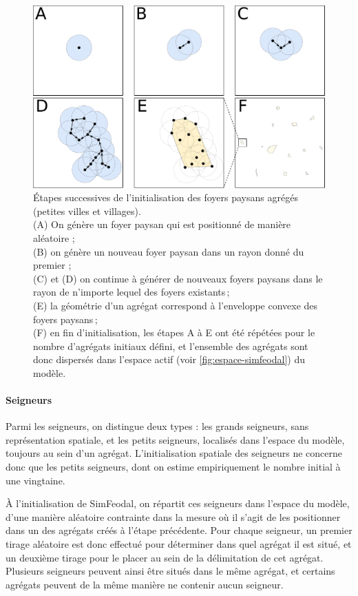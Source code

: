 \begin{figure}[H]
	\centering
	\includegraphics[width=.98\linewidth]{img/init_fp.pdf}
	\caption{Étapes successives de l'initialisation des foyers paysans agrégés (petites villes et villages).\\
	(A) On génère un foyer paysan qui est positionné de manière aléatoire ;\\
	(B) on génère un nouveau foyer paysan dans un rayon donné du premier ;\\
	(C) et (D) on continue à générer de nouveaux foyers paysans dans le rayon de n'importe lequel des foyers existants ;\\
	(E) la géométrie d'un agrégat correspond à l'enveloppe convexe des foyers paysans ;\\
	(F) en fin d'initialisation, les étapes A à E ont été répétées pour le nombre d'agrégats initiaux défini, et l'ensemble des agrégats sont donc dispersés dans l'espace actif (voir \cref{fig:espace-simfeodal}) du modèle.}
	\label{fig:init-fp}
\end{figure}


\paragraph{Seigneurs}
Parmi les seigneurs, on distingue deux types : les grands seigneurs, sans représentation spatiale, et les petits seigneurs, localisés dans l'espace du modèle, toujours au sein d'un agrégat.
L'initialisation spatiale des seigneurs ne concerne donc que les petits seigneurs, dont on estime empiriquement le nombre initial à une vingtaine.

À l'initialisation de SimFeodal, on répartit ces seigneurs dans l'espace du modèle, d'une manière aléatoire contrainte dans la mesure où il s'agit de les positionner dans un des agrégats créés à l'étape précédente.
Pour chaque seigneur, un premier tirage aléatoire est donc effectué pour déterminer dans quel agrégat il est situé, et un deuxième tirage pour le placer au sein de la délimitation de cet agrégat.
Plusieurs seigneurs peuvent ainsi être situés dans le même agrégat, et certains agrégats peuvent de la même manière ne contenir aucun seigneur.

